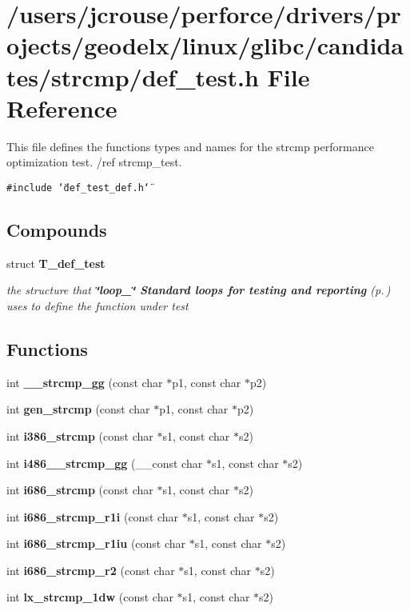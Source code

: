 \section{/users/jcrouse/perforce/drivers/projects/geodelx/linux/glibc/candidates/strcmp/def\_\-test.h File Reference}
\label{strcmp_2def__test_8h}
This file defines the functions types and names for the strcmp performance optimization test. /ref strcmp\_\-test. 


{\tt \#include \char`\"{}def\_\-test\_\-def.h\char`\"{}}\par
\subsection*{Compounds}
\begin{CompactItemize}
\item 
struct {\bf T\_\-def\_\-test}
\begin{CompactList}\small\item\em the structure that {\bf \char`\"{}loop\_\-\char`\"{} Standard loops for testing and reporting} {\rm (p.\,\pageref{group__loop__test})} uses to define the function under test\item\end{CompactList}\end{CompactItemize}
\subsection*{Functions}
\begin{CompactItemize}
\item 
int {\bf \_\-\_\-strcmp\_\-gg} (const char $\ast$p1, const char $\ast$p2)
\item 
int {\bf gen\_\-strcmp} (const char $\ast$p1, const char $\ast$p2)
\item 
int {\bf i386\_\-strcmp} (const char $\ast$s1, const char $\ast$s2)
\item 
int {\bf i486\_\-\_\-strcmp\_\-gg} (\_\-\_\-const char $\ast$s1, const char $\ast$s2)
\item 
int {\bf i686\_\-strcmp} (const char $\ast$s1, const char $\ast$s2)
\item 
int {\bf i686\_\-strcmp\_\-r1i} (const char $\ast$s1, const char $\ast$s2)
\item 
int {\bf i686\_\-strcmp\_\-r1iu} (const char $\ast$s1, const char $\ast$s2)
\item 
int {\bf i686\_\-strcmp\_\-r2} (const char $\ast$s1, const char $\ast$s2)
\item 
int {\bf lx\_\-strcmp\_\-1dw} (const char $\ast$s1, const char $\ast$s2)
\end{CompactItemize}


